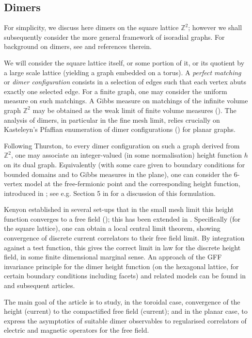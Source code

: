 \documentclass[10pt]{article}
\newcommand{\Z}{\mathbb{Z}}
\begin{document}
\subsection{Dimers}

For simplicity, we discuss here dimers on the square lattice $\Z^2$; however we shall subsequently consider the more general framework of isoradial graphs. For background on dimers, see \cite{Ken_IAS} and references therein.

We will consider the square lattice itself, or some portion of it, or its quotient by a large scale lattice (yielding a graph embedded on a torus). A {\em perfect matching} or {\em dimer configuration} consists in a selection of edges such that each vertex abuts exactly one selected edge. For a finite graph, one may consider the uniform measure on such matchings. A Gibbs measure on matchings of the infinite volume graph $\Z^2$ may be obtained as the weak limit of finite volume measures (\cite{CKP,KOS,dT_isoradial}). The analysis of dimers, in particular in the fine mesh limit, relies crucially on Kasteleyn's Pfaffian enumeration of dimer configurations (\cite{Kas_square}) for planar graphs.

Following Thurston, to every dimer configuration on such a graph derived from $\Z^2$, one may associate an integer-valued (in some normalisation) height function $h$ on its dual graph. Equivalently (with some care given to boundary conditions for bounded domains and to Gibbs measures in the plane), one can consider the $6$-vertex model at the free-fermionic point and the corresponding height function, introduced in \cite{Beijeren}; see e.g. Section 5 in \cite{Dub_abelian} for a discussion of this formulation.

Kenyon established in several set-ups that in the small mesh limit this height function converges to a free field (\cite{Ken_domino_GFF}); this has been extended in \cite{dT_isoradial,KOS,Ken_honeycomb}. Specifically (for the square lattice), one can obtain a local central limit theorem, showing convergence of discrete current correlators to their free field limit. By integration against a test function, this gives the correct limit in law for the discrete height field, in some finite dimensional marginal sense. An approach of the GFF invariance principle for the dimer height function (on the hexagonal lattice, for certain boundary conditions including facets) and related models can be found in \cite{BorFer_growth} and subsequent articles.

The main goal of the article is to study, in the toroidal case, convergence of the height (current) to the compactified free field (current); and in the planar case, to express the asymptotics of suitable dimer observables to regularised correlators of electric and magnetic operators for the free field.
\end{document}
